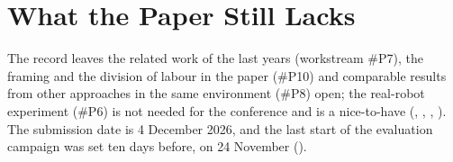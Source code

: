 \section{What the Paper Still Lacks}
\label{sec:paper-open}

The record leaves the related work of the last years (workstream \#P7), the framing
and the division of labour in the paper (\#P10) and comparable results from other
approaches in the same environment (\#P8) open; the real-robot experiment (\#P6) is
not needed for the conference and is a nice-to-have (, , ,
). The submission date is 4 December 2026, and the last start of the
evaluation campaign was set ten days before, on 24 November ().
